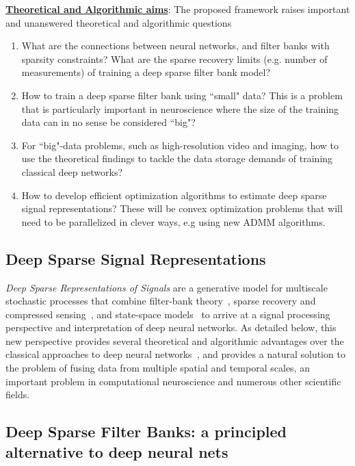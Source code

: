 \documentclass[12pt]{article}
\begin{document}
\noindent \textbf{\underline{Theoretical and Algorithmic aims}}: The proposed framework raises important and unanswered theoretical and algorithmic questions

\begin{enumerate}
	\item What are the connections between neural networks, and filter banks with sparsity constraints?  What are the sparse recovery limits (e.g. number of measurements) of training a deep sparse filter bank model?
	\item How to train a deep sparse filter bank using ``small" data? This is a problem that is particularly important in neuroscience where the size of the training data can in no sense be considered ``big"?
	\item For ``big"-data problems, such as high-resolution video and imaging, how to use the theoretical findings to tackle the data storage demands of training classical deep networks?

	\item How to develop efficient optimization algorithms to estimate deep sparse signal representations? These will be convex optimization problems that will need to be parallelized in clever ways, e.g using new ADMM algorithms.	
	
\end{enumerate}

\subsection*{Deep Sparse Signal Representations}

\emph{Deep Sparse Representations of Signals} are a generative model for multiscale stochastic processes that combine filter-bank theory~\cite{fliege1994multirate,strang1996wavelets,daubechies1992ten}, sparse recovery and compressed sensing~\cite{donoho2006compressed,candes2008introduction}, and state-space models~\cite{Ba:12,ba2013b} to arrive at a signal processing perspective and interpretation of deep neural networks. As detailed below, this new perspective provides several theoretical and algorithmic advantages over the classical approaches to deep neural networks~\cite{lecun2015deep}, and provides a natural solution to the problem of fusing data from multiple spatial and temporal scales, an important problem in computational neuroscience and numerous other scientific fields.

\subsection*{Deep Sparse Filter Banks: a principled alternative to deep neural nets}
\end{document}
